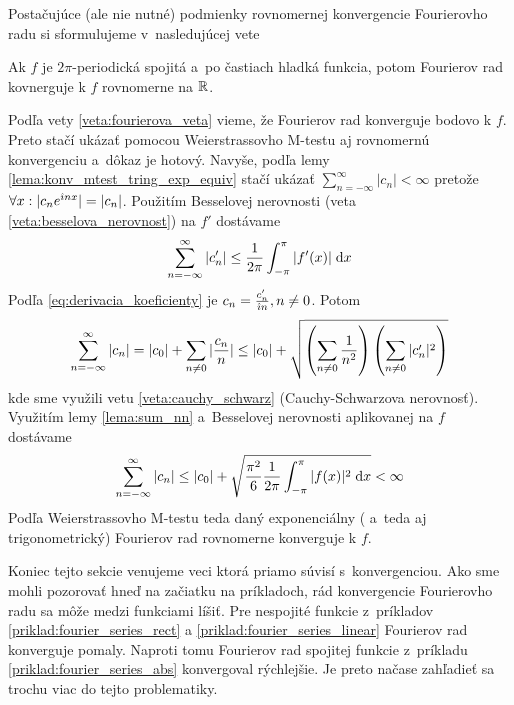 Postačujúce (ale nie nutné) podmienky rovnomernej konvergencie
Fourierovho radu si sformulujeme v~nasledujúcej vete
\begin{veta}
 Ak $f$ je $2\pi$-periodická spojitá a~po častiach hladká funkcia,
 potom Fourierov rad kovnerguje k $f$ rovnomerne na ${\mathbb R}$.
\end{veta}
\begin{dokaz}
    Podľa vety \ref{veta:fourierova_veta} vieme, že Fourierov rad
    konverguje bodovo k $f$. Preto stačí ukázať pomocou
    Weierstrassovho M-testu aj rovnomernú konvergenciu a~dôkaz je
    hotový. Navyše, podľa lemy \ref{lema:konv_mtest_tring_exp_equiv}
    stačí ukázať $\sum_{n=-\infty}^{\infty} |c_n| < \infty$
    pretože $\forall x: |c_n e^{\hat{\imath} n x}|=|c_n|$.
    Použitím  Besselovej nerovnosti (veta
    \ref{veta:besselova_nerovnost})  na $f'$ dostávame
    \begin{equation}
        \sum_{n=-\infty}^{\infty} |c_n'| \le \frac{1}{2\pi} \int_{-\pi}^{\pi} |f'(x)| \; \mathrm{d} x
    \end{equation}
    Podľa \eqref{eq:derivacia_koeficienty} je 
    $c_n = \frac{c_n'}{\hat{\imath} n}, n\not=0$. Potom
    \begin{equation}
        \sum_{n=-\infty}^{\infty} |c_n| = |c_0| + \sum_{n\not=0} |\frac{c_n}{n}| \le
         |c_0| + \sqrt{\left( \sum_{n\not=0} \frac{1}{n^2} \right)
                       \left( \sum_{n\not=0} |c_n'|^2 \right)
                       }
    \end{equation}
     kde sme využili vetu \ref{veta:cauchy_schwarz} (Cauchy-Schwarzova
     nerovnosť).
     Využitím lemy \ref{lema:sum_nn} a~Besselovej nerovnosti
     aplikovanej na $f$ dostávame
    \begin{equation}
        \sum_{n=-\infty}^{\infty} |c_n| \le 
         |c_0| + \sqrt{\frac{\pi^2}{6} \frac{1}{2\pi} 
                       \int_{-\pi}^{\pi} |f(x)|^2 \; \mathrm{d} x} < \infty
    \end{equation}
    Podľa Weierstrassovho M-testu teda daný exponenciálny ( a~teda
    aj trigonometrický) Fourierov  rad rovnomerne konverguje k $f$. 
    \end{dokaz}


Koniec tejto sekcie venujeme veci ktorá priamo súvisí s~konvergenciou.
Ako sme mohli pozorovať hneď na začiatku na príkladoch, rád
konvergencie Fourierovho radu sa môže medzi funkciami líšiť. 
Pre nespojité funkcie z~príkladov \ref{priklad:fourier_series_rect}
a \ref{priklad:fourier_series_linear} Fourierov rad 
konverguje pomaly. Naproti tomu Fourierov rad spojitej
funkcie z~príkladu \ref{priklad:fourier_series_abs} konvergoval rýchlejšie.
Je preto načase zahľadieť sa trochu viac do tejto problematiky.

